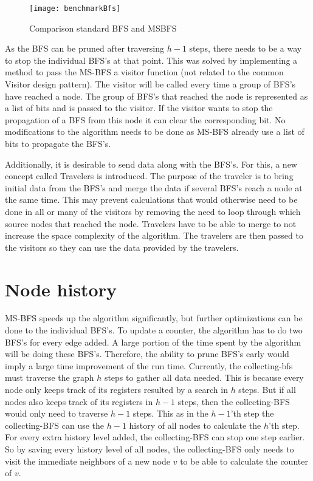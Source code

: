 \begin{figure}[h]
\centering
\texttt{[image: benchmarkBfs]}    
\captionsetup{justification=centering}
\caption {Comparison standard BFS and MSBFS}
\label{fig:benchmarkbfs}
\end{figure}

As the BFS can be pruned after traversing $h-1$ steps, there needs to be a way to stop the individual BFS's at that point. This was solved by implementing a method to pass the MS-BFS a visitor function (not related to the common Visitor design pattern). The visitor will be called every time a group of BFS's have reached a node. The group of BFS's that reached the node is represented as a list of bits and is passed to the visitor. If the visitor wants to stop the propagation of a BFS from this node it can clear the corresponding bit. No modifications to the algorithm needs to be done as MS-BFS already use a list of bits to propagate the BFS's.

Additionally, it is desirable to send data along with the BFS's. For this, a new concept called Travelers is introduced. The purpose of the traveler is to bring initial data from the BFS's and merge the data if several BFS's reach a node at the same time. This may prevent calculations that would otherwise need to be done in all or many of the visitors by removing the need to loop through which source nodes that reached the node. Travelers have to be able to merge to not increase the space complexity of the algorithm. The travelers are then passed to the visitors so they can use the data provided by the travelers. 

\section{Node history}

MS-BFS speeds up the algorithm significantly, but further optimizations can be done to the individual BFS's. To update a counter, the algorithm has to do two BFS's for every edge added. A large portion of the time spent by the algorithm will be doing these BFS's. Therefore, the ability to prune BFS's early would imply a large time improvement of the run time. Currently, the collecting-bfs must traverse the graph $h$ steps to gather all data needed. This is because every node only keeps track of its registers resulted by a search in $h$ steps. But if all nodes also keeps track of its registers in $h-1$ steps, then the collecting-BFS would only need to traverse $h-1$ steps. This as in the $h-1$'th step the collecting-BFS can use the $h-1$ history of all nodes to calculate the $h$'th step. For every extra history level added, the collecting-BFS can stop one step earlier. So by saving every history level of all nodes, the collecting-BFS only needs to visit the immediate neighbors of a new node $v$ to be able to calculate the counter of $v$. 

